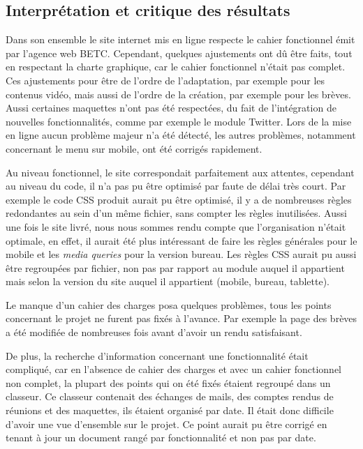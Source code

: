 \documentclass[12pt,a4paper]{article}
\begin{document}
\subsection{Interprétation et critique des résultats}
Dans son ensemble le site internet mis en ligne respecte le cahier fonctionnel émit par l'agence web BETC. Cependant, quelques ajustements ont dû être faits, tout en respectant la charte graphique, car le cahier fonctionnel n'était pas complet. Ces ajustements pour être de l'ordre de l'adaptation, par exemple pour les contenus vidéo, mais aussi de l'ordre de la création, par exemple pour les brèves. Aussi certaines maquettes n'ont pas été respectées, du fait de l'intégration de nouvelles fonctionnalités, comme par exemple le module Twitter. Lors de la mise en ligne aucun problème majeur n'a été détecté, les autres problèmes, notamment concernant le menu sur mobile, ont été corrigés rapidement.\par 
\medskip
Au niveau fonctionnel, le site correspondait parfaitement aux attentes, cependant au niveau du code, il n'a pas pu être optimisé par faute de délai très court. Par exemple le code \gls{CSS} produit aurait pu être optimisé, il y a de nombreuses règles redondantes au sein d'un même fichier, sans compter les règles inutilisées. Aussi une fois le site livré, nous nous sommes rendu compte que l'organisation n'était optimale, en effet, il aurait été plus intéressant de faire les règles générales pour le mobile et les \textit{media queries} pour la version bureau. Les règles \gls{CSS} aurait pu aussi être regroupées par fichier, non pas par rapport au module auquel il appartient mais selon la version du site auquel il appartient (mobile, bureau, tablette).\par
\medskip
Le manque d'un cahier des charges posa quelques problèmes, tous les points concernant le projet ne furent pas fixés à l'avance. Par exemple la page des brèves a été modifiée de nombreuses fois avant d'avoir un rendu satisfaisant.\par 
De plus, la recherche d'information concernant une fonctionnalité était compliqué, car en l'absence de cahier des charges et avec un cahier fonctionnel non complet, la plupart des points qui on été fixés étaient regroupé dans un classeur. Ce classeur contenait des échanges de mails, des comptes rendus de réunions et des maquettes, ils étaient organisé par date. Il était donc difficile d'avoir une  vue d'ensemble sur le projet. Ce point aurait pu être corrigé en tenant à jour un document rangé par fonctionnalité et non pas par date.\par 
\end{document}

